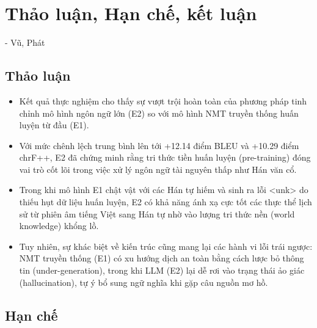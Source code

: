 \section{Thảo luận, Hạn chế, kết luận} - Vũ, Phát

\subsection{Thảo luận}
\begin{itemize}
\item Kết quả thực nghiệm cho thấy sự vượt trội hoàn toàn của phương pháp tinh chỉnh mô hình ngôn ngữ lớn (E2) so với mô hình NMT truyền thống huấn luyện từ đầu (E1).  

\item Với mức chênh lệch trung bình lên tới +12.14 điểm BLEU và +10.29 điểm chrF++, E2 đã chứng minh rằng tri thức tiền huấn luyện (pre-training) đóng vai trò cốt lõi trong việc xử lý ngôn ngữ tài nguyên thấp như Hán văn cổ.  

\item Trong khi mô hình E1 chật vật với các Hán tự hiếm và sinh ra lỗi <unk> do thiếu hụt dữ liệu huấn luyện, E2 có khả năng ánh xạ cực tốt các thực thể lịch sử từ phiên âm tiếng Việt sang Hán tự nhờ vào lượng tri thức nền (world knowledge) khổng lồ.  

\item Tuy nhiên, sự khác biệt về kiến trúc cũng mang lại các hành vi lỗi trái ngược: NMT truyền thống (E1) có xu hướng dịch an toàn bằng cách lược bỏ thông tin (under-generation), trong khi LLM (E2) lại dễ rơi vào trạng thái ảo giác (hallucination), tự ý bổ sung ngữ nghĩa khi gặp câu nguồn mơ hồ. 
\end{itemize}
\subsection{Hạn chế}

